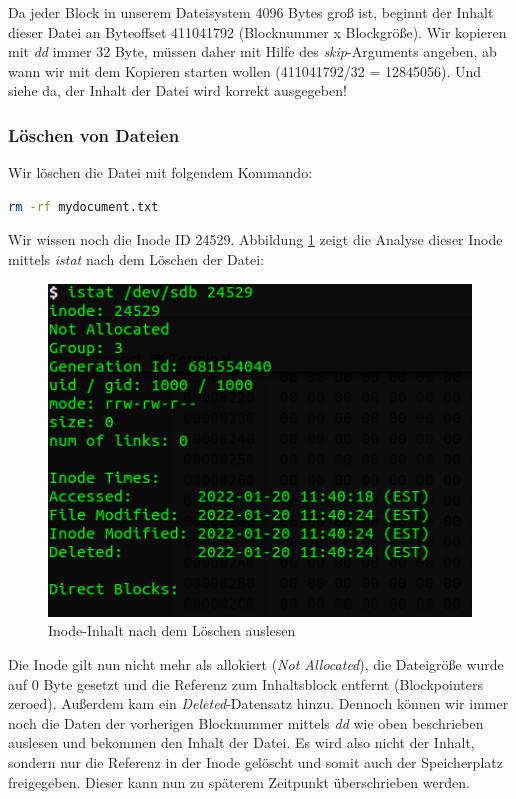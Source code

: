 Da jeder Block in unserem Dateisystem 4096 Bytes groß ist, beginnt der Inhalt dieser Datei an Byteoffset 411041792 (Blocknummer x Blockgröße). Wir kopieren mit \textit{dd} immer 32 Byte, müssen daher mit Hilfe des \textit{skip}-Arguments angeben, ab wann wir mit dem Kopieren starten wollen (411041792/32 = 12845056). Und siehe da, der Inhalt der Datei wird korrekt ausgegeben!

\subsubsection{Löschen von Dateien}

Wir löschen die Datei mit folgendem Kommando:

\begin{lstlisting}[language=bash]
rm -rf mydocument.txt
\end{lstlisting} 

Wir wissen noch die Inode ID 24529. Abbildung \ref{fig:istatafterdelete} zeigt die Analyse dieser Inode mittels \textit{istat} nach dem Löschen der Datei:

\begin{figure}[H]
	\centering
	\includegraphics[width=12cm,keepaspectratio=true]{pictures/istatafterdelete.png}
	\caption{
		Inode-Inhalt nach dem Löschen auslesen
	}
	\label{fig:istatafterdelete}
\end{figure}

Die Inode gilt nun nicht mehr als allokiert (\textit{Not Allocated}), die Dateigröße wurde auf 0 Byte gesetzt und die Referenz zum Inhaltsblock entfernt (Blockpointers zeroed). Außerdem kam ein \textit{Deleted}-Datensatz hinzu. Dennoch können wir immer noch die Daten der vorherigen Blocknummer mittels \textit{dd} wie oben beschrieben auslesen und bekommen den Inhalt der Datei. Es wird also nicht der Inhalt, sondern nur die Referenz in der Inode gelöscht und somit auch der Speicherplatz freigegeben. Dieser kann nun zu späterem Zeitpunkt überschrieben werden.


